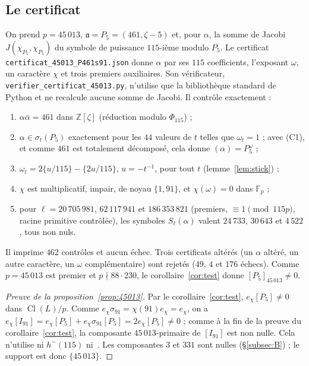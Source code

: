 \documentclass[11pt,a4paper]{amsart}
\theoremstyle{plain}
\theoremstyle{definition}
\newcommand{\Z}{\mathbb{Z}}
\newcommand{\F}{\mathbb{F}}
\newcommand{\aaa}{\mathfrak{a}}
\DeclareMathOperator{\Cl}{Cl}
\begin{document}
\subsection{Le certificat}\label{subsec:certificat}
On prend $p=45\,013$, $\aaa=P_5=(461,\zeta-5)$ et, pour $\alpha$, la somme de Jacobi $J(\chi_{P_5},\chi_{P_5})$ du symbole de puissance $115$-ième modulo $P_5$. Le certificat \texttt{certificat\_45013\_P461s91.json} donne $\alpha$ par ses $115$ coefficients, l'exposant $\omega$, un caractère $\chi$ et trois premiers auxiliaires. Son vérificateur, \texttt{verifier\_certificat\_45013.py}, n'utilise que la bibliothèque standard de Python et ne recalcule aucune somme de Jacobi. Il contrôle exactement :
\begin{enumerate}[label=\textup{(C\arabic*)}]
\item $\alpha\bar\alpha=461$ dans $\Z[\zeta]$ (réduction modulo $\Phi_{115}$) ;
\item $\alpha\in\sigma_t(P_5)$ exactement pour les $44$ valeurs de $t$ telles que $\omega_t=1$ ; avec (C1), et comme $461$ est totalement décomposé, cela donne $(\alpha)=P_5^\omega$ ;
\item $\omega_t=2\{u/115\}-\{2u/115\}$, $u=-t^{-1}$, pour tout $t$ (lemme~\ref{lem:stick}) ;
\item $\chi$ est multiplicatif, impair, de noyau $\{1,91\}$, et $\chi(\omega)=0$ dans $\F_p$ ;
\item pour $\ell=20\,705\,981$, $62\,117\,941$ et $186\,353\,821$ (premiers, $\equiv1\pmod{115p}$, racine primitive contrôlée), les symboles $S_\ell(\alpha)$ valent $24\,733$, $30\,643$ et $4\,522$, tous non nuls.
\end{enumerate}
Il imprime $462$ contrôles et aucun échec. Trois certificats altérés (un $\alpha$ altéré, un autre caractère, un $\omega$ complémentaire) sont rejetés ($49$, $4$ et $176$ échecs). Comme $p=45\,013$ est premier et $p\nmid88\cdot230$, le corollaire~\ref{cor:test} donne $[P_5]_{45\,013}\neq0$.

\begin{proof}[Preuve de la proposition~\ref{prop:45013}]
Par le corollaire~\ref{cor:test}, $e_\chi[P_5]\ne0$ dans $\Cl(L)/p$. Comme $e_\chi\sigma_{91}=\chi(91)e_\chi=e_\chi$, on a $e_\chi[I_{91}]=e_\chi[P_5]+e_\chi\sigma_{91}[P_5]=2e_\chi[P_5]\ne0$ ; comme à la fin de la preuve du corollaire~\ref{cor:test}, la composante $45\,013$-primaire de $[I_{91}]$ est non nulle. Cela n'utilise ni $h^-(115)$ ni~\cite{Mil14}. Les composantes $3$ et $331$ sont nulles (\S\ref{subsec:B}) ; le support est donc $\{45\,013\}$.
\end{proof}
\end{document}
